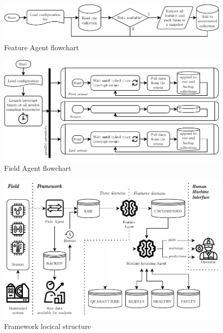 \begin{figure}
    \centering
    \includegraphics[width=\textwidth]{images/Framework/FA_flowchart.pdf}
    \caption{Feature Agent flowchart}
    \label{fig:FA_flowchart}
\end{figure}

\begin{figure}
    \centering
    \includegraphics[scale=1]{images/Framework/Field_Agent_flowchart.pdf}
    \caption{Field Agent flowchart}
    \label{fig:Field_Agent_flowchart}
\end{figure}

\begin{figure}
    \centering
    \includegraphics[width=\textwidth]{images/Framework/Framework_structure.pdf}
    \caption{Framework locical structure}
    \label{fig:Framework_structure}
\end{figure}


